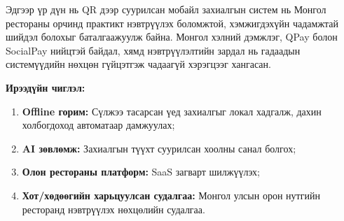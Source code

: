 \medskip

Эдгээр үр дүн нь QR дээр суурилсан мобайл захиалгын систем нь Монгол рестораны
орчинд практикт нэвтрүүлэх боломжтой, хэмжигдэхүйн чадамжтай шийдэл болохыг
баталгаажуулж байна. Монгол хэлний дэмжлэг, QPay болон SocialPay нийцтэй байдал,
хямд нэвтрүүлэлтийн зардал нь гадаадын системүүдийн нөхцөн гүйцэтгэж чадаагүй
хэрэгцээг хангасан.

\medskip

\textbf{Ирээдүйн чиглэл:}
\begin{enumerate}
    \item \textbf{Offline горим:} Сүлжээ тасарсан үед захиалгыг локал хадгалж,
          дахин холбогдоход автоматаар дамжуулах;
    \item \textbf{AI зөвлөмж:} Захиалгын түүхт суурилсан хоолны санал болгох;
    \item \textbf{Олон рестораны платформ:} SaaS загварт шилжүүлэх;
    \item \textbf{Хот/хөдөөгийн харьцуулсан судалгаа:} Монгол улсын орон нутгийн
          ресторанд нэвтрүүлэх нөхцөлийн судалгаа.
\end{enumerate}
